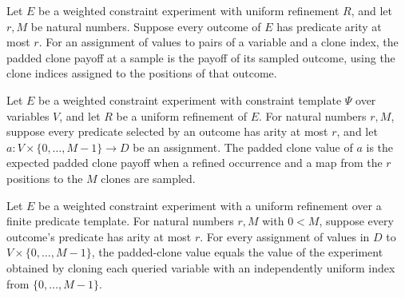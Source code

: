 \begin{definition}
\label{FABL.WeightedConstraintExperiment.UniformRefinement.paddedClonePayoff}
\leanok
{}
Let $E$ be a weighted constraint experiment with uniform refinement $R$, and let $r,M$
be natural numbers. Suppose every outcome of $E$ has predicate arity at most $r$. For an
assignment of values to pairs of a variable and a clone index, the padded clone payoff
at a sample is the payoff of its sampled outcome, using the clone indices assigned to
the positions of that outcome.
\end{definition}

\begin{definition}
\label{FABL.WeightedConstraintExperiment.UniformRefinement.paddedCloneValue}
\leanok
{}
Let $E$ be a weighted constraint experiment with constraint template $\Psi$ over
variables $V$, and let $R$ be a uniform refinement of $E$. For natural numbers $r,M$,
suppose every predicate selected by an outcome has arity at most $r$, and let
$a:V\times\{0,\ldots,M-1\}\to D$ be an assignment. The padded clone value of $a$ is the
expected padded clone payoff when a refined occurrence and a map from the $r$ positions
to the $M$ clones are sampled.
\end{definition}

\begin{theorem}
\label{FABL.WeightedConstraintExperiment.UniformRefinement.paddedCloneValue_eq_clone_value}
\leanok
{}
Let $E$ be a weighted constraint experiment with a uniform refinement over a finite
predicate template. For natural numbers $r,M$ with $0<M$, suppose every outcome's
predicate has arity at most $r$. For every assignment of values in $D$ to
$V\times\{0,\ldots,M-1\}$, the padded-clone value equals the value of the experiment
obtained by cloning each queried variable with an independently uniform index from
$\{0,\ldots,M-1\}$.
\end{theorem}


